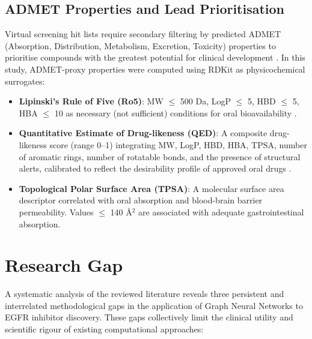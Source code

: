 \subsection{ADMET Properties and Lead Prioritisation}

Virtual screening hit lists require secondary filtering by predicted ADMET
(Absorption, Distribution, Metabolism, Excretion, Toxicity) properties to
prioritise compounds with the greatest potential for clinical development
\parencite{walters2020generative}. In this study, ADMET-proxy properties were
computed using RDKit as physicochemical surrogates:

\begin{itemize}
    \item \textbf{Lipinski's Rule of Five (Ro5)}: MW $\leq$ 500 Da, LogP $\leq$ 5,
    HBD $\leq$ 5, HBA $\leq$ 10 as necessary (not sufficient) conditions for
    oral bioavailability \parencite{lipinski2001experimental}.
    \item \textbf{Quantitative Estimate of Drug-likeness (QED)}: A composite
    drug-likeness score (range 0--1) integrating MW, LogP, HBD, HBA, TPSA, number
    of aromatic rings, number of rotatable bonds, and the presence of structural
    alerts, calibrated to reflect the desirability profile of approved oral drugs
    \parencite{bickerton2012quantifying}.
    \item \textbf{Topological Polar Surface Area (TPSA)}: A molecular surface
    area descriptor correlated with oral absorption and blood-brain barrier
    permeability. Values $\leq$ 140 \AA$^2$ are associated with adequate
    gastrointestinal absorption.
\end{itemize}

\section{Research Gap}
\label{sec:research_gap}

A systematic analysis of the reviewed literature reveals three persistent and
interrelated methodological gaps in the application of Graph Neural Networks to
EGFR inhibitor discovery. These gaps collectively limit the clinical utility and
scientific rigour of existing computational approaches:


